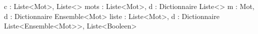 \begin{algorithme}
		{c : \caractere}%
		{Liste<Mot>, Liste<\naturel>}
		{mots : Liste<Mot>, d : Dictionnaire}%
		{Liste<\booleen>}
		{m : Mot, d : Dictionnaire}%
		{Ensemble<Mot>}%
		{liste : Liste<Mot>, d : Dictionnaire}%
		{Liste<Ensemble<Mot>>, Liste<Booleen>}%
\end{algorithme}
